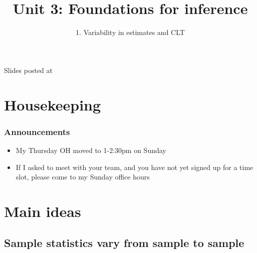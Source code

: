 \documentclass[11pt,containsverbatim,handout,xcolor=xelatex,dvipsnames,table]{beamer}
\title{Unit 3: Foundations for inference}
\subtitle{1. Variability in estimates and CLT}
\author{\CourseName}
\date{}
\institute{\InstituteName}
\begin{document}



\begin{frame}[plain]

\titlepage

\vfill

{\scriptsize {} \hfill Slides posted at  \webURL{\CourseSite}}

\addtocounter{framenumber}{-1} 

\end{frame}


\section{Housekeeping}


\begin{frame}
\frametitle{Announcements}

\begin{itemize}

\item My Thursday OH moved to 1-2:30pm on Sunday

\item If I asked to meet with your team, and you have not yet signed up for a time slot, please come to my Sunday office hours

\end{itemize}

\end{frame}


\section{Main ideas}


\subsection{Sample statistics vary from sample to sample}
\label{mi1}

\end{document}

